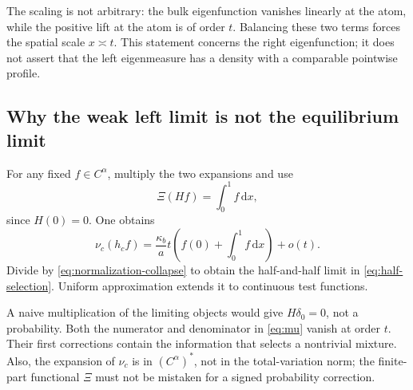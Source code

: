 \documentclass[11pt,a4paper]{article}
\numberwithin{equation}{section}
\theoremstyle{definition}
\theoremstyle{remark}
\newcommand{\dd}{\,\mathrm d}
\begin{document}
The scaling is not arbitrary: the bulk eigenfunction vanishes linearly
at the atom, while the positive lift at the atom is of order $t$.
Balancing these two terms forces the spatial scale $x\asymp t$.
This statement concerns the right eigenfunction; it does not assert
that the left eigenmeasure has a density with a comparable pointwise
profile.

\subsection{Why the weak left limit is not the equilibrium limit}
For any fixed $f\in C^\alpha$, multiply the two expansions and use
\begin{equation}
 \Xi(Hf)=\int_0^1f\dd x,
 \label{eq:key-pairing}
\end{equation}
since $H(0)=0$. One obtains
\begin{equation}
 \nu_c(h_cf)=\frac{\kappa_b}{a}t
        \left(f(0)+\int_0^1f\dd x\right)+o(t).
 \label{eq:pairing-critical}
\end{equation}
Divide by \cref{eq:normalization-collapse} to obtain the half-and-half
limit in \cref{eq:half-selection}. Uniform approximation extends it to
continuous test functions.

A naive multiplication of the limiting objects would give
$H\delta_0=0$, not a probability. Both the numerator and denominator in
\cref{eq:mu} vanish at order $t$. Their first corrections contain the
information that selects a nontrivial mixture. Also, the expansion of
$\nu_c$ is in $(C^\alpha)^*$, not in the total-variation norm; the
finite-part functional $\Xi$ must not be mistaken for a signed
probability correction.
\end{document}
